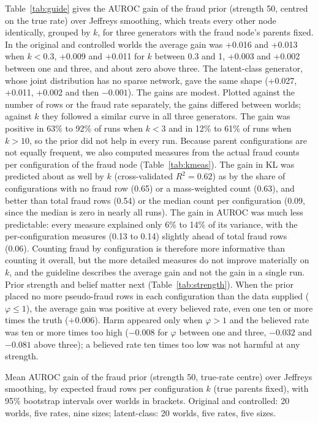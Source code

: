 \documentclass[final,5p,times,authoryear]{elsarticle}
\begin{document}
Table~\ref{tab:guide} gives the AUROC gain of the fraud prior (strength 50, centred on the true rate) over Jeffreys smoothing, which treats every other node identically, grouped by $k$, for three generators with the fraud node's parents fixed. In the original and controlled worlds the average gain was +0.016 and +0.013 when $k<0.3$, +0.009 and +0.011 for $k$ between 0.3 and 1, +0.003 and +0.002 between one and three, and about zero above three. The latent-class generator, whose joint distribution has no sparse network, gave the same shape (+0.027, +0.011, +0.002 and then $-0.001$). The gains are modest. Plotted against the number of rows or the fraud rate separately, the gains differed between worlds; against $k$ they followed a similar curve in all three generators. The gain was positive in 63\% to 92\% of runs when $k<3$ and in 12\% to 61\% of runs when $k>10$, so the prior did not help in every run. Because parent configurations are not equally frequent, we also computed measures from the actual fraud counts per configuration of the fraud node (Table~\ref{tab:kmeas}). The gain in KL was predicted about as well by $k$ (cross-validated $R^2=0.62$) as by the share of configurations with no fraud row (0.65) or a mass-weighted count (0.63), and better than total fraud rows (0.54) or the median count per configuration (0.09, since the median is zero in nearly all runs). The gain in AUROC was much less predictable: every measure explained only 6\% to 14\% of its variance, with the per-configuration measures (0.13 to 0.14) slightly ahead of total fraud rows (0.06). Counting fraud by configuration is therefore more informative than counting it overall, but the more detailed measures do not improve materially on $k$, and the guideline describes the average gain and not the gain in a single run. Prior strength and belief matter next (Table~\ref{tab:strength}). When the prior placed no more pseudo-fraud rows in each configuration than the data supplied ($\varphi\le1$), the average gain was positive at every believed rate, even one ten or more times the truth ($+0.006$). Harm appeared only when $\varphi>1$ and the believed rate was ten or more times too high ($-0.008$ for $\varphi$ between one and three, $-0.032$ and $-0.081$ above three); a believed rate ten times too low was not harmful at any strength.

\begin{table}[H]
\centering\footnotesize
\begin{adjustbox}{max width=\linewidth}\end{adjustbox}
\caption{Mean AUROC gain of the fraud prior (strength 50, true-rate centre) over Jeffreys smoothing, by expected fraud rows per configuration $k$ (true parents fixed), with 95\% bootstrap intervals over worlds in brackets. Original and controlled: 20 worlds, five rates, nine sizes; latent-class: 20 worlds, five rates, five sizes.}\label{tab:guide}
\end{table}
\end{document}
